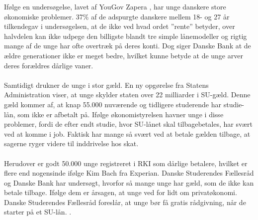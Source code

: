 
Ifølge en undersøgelse, lavet af YouGov Zapera \cite{DanskeB1}, har unge danskere store økonomiske problemer. 37\% af de adspurgte danskere mellem 18- og 27 år tilkendegav i undersøgelsen, at de ikke ved hvad ordet ”rente” betyder, over halvdelen kan ikke udpege den billigste blandt tre simple lånemodeller og rigtig mange af de unge har ofte overtræk på deres konti. Dog siger Danske Bank at de ældre generationer ikke er meget bedre, hvilket kunne betyde at de unge arver deres forældres dårlige vaner.  \\
\\
Samtidigt drukner de unge i stor gæld. En ny opgørelse fra Statens Administration viser, at unge skylder staten over 22 milliarder i SU-gæld. Denne gæld kommer af, at knap 55.000\cite{dr.dk} nuværende og tidligere studerende har studie-lån, som ikke er afbetalt på. Ifølge økonomistyrelsen havner unge i disse problemer, fordi de efter endt studie, hvor SU-lånet skal tilbagebetales, har svært ved at komme i job\cite{jobindex}. Faktisk har mange så svært ved at betale gælden tilbage, at sagerne ryger videre til inddrivelse hos skat\cite{BusinessDK1}.\\
\\
Herudover er godt 50.000 unge registreret i RKI som dårlige betalere, hvilket er flere end nogensinde ifølge Kim Bach fra Experian. Danske Studerendes Fællesråd og Danske Bank har undersøgt, hvorfor så mange unge har gæld, som de ikke kan betale tilbage. Ifølge dem er årsagen, at unge ved for lidt om privatøkonomi. Danske Studerendes Fællesråd foreslår, at unge bør få gratis rådgivning, når de starter på et SU-lån. \cite{dr.dk}.
